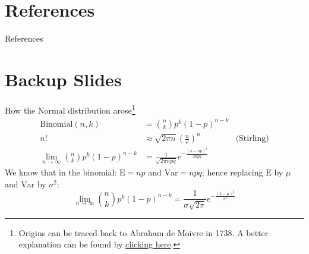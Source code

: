 \documentclass[aspectratio=169]{beamer}                    %
\begin{document}








%

%
%


\begingroup
\AtBeginSection[]{}
\section{References}
\begin{frame}[allowframebreaks]{References}
	\printbibliography
\end{frame}
\endgroup

\appendix %
\section*{Backup Slides}
\begin{frame}[plain, noframenumbering, label=appendixnormal]{How the Normal
		distribution arose\footnote{Origins can be traced back to
			Abraham de Moivre in 1738.
			A better explanation can be found by
			\href{http://www.stat.yale.edu/~pollard/Courses/241.fall2014/notes2014/Bin.Normal.pdf}{clicking here}.}}
	$$
		\begin{aligned}
			\text{Binomial}(n, k)                            & = \binom{n}{k} p^k (1-p)^{n-k}                                                \\
			n!                                               & \approx \sqrt{2 \pi n} \left(\frac{n}{e}\right)^n         & \text{(Stirling)} \\
			\lim_{n \to \infty} \binom{n}{k} p^k (1-p)^{n-k} & = \frac{1}{\sqrt{2 \pi npq}} e^{-\frac{(k - np)^2}{2npq}}
		\end{aligned}
	$$
	We know that in the binomial: $\mathrm{E} = np$ and $\mathrm{Var} = npq$; hence replacing $\mathrm{E}$ by $\mu$ and $\mathrm{Var}$ by $\sigma^2$:
	$$\lim_{n \to \infty} \binom{n}{k} p^k (1-p)^{n-k} = \frac{1}{\sigma \sqrt{2 \pi}} e^{-\frac{(k - \mu)^2}{\sigma^2}}$$
\end{frame}
\end{document}
